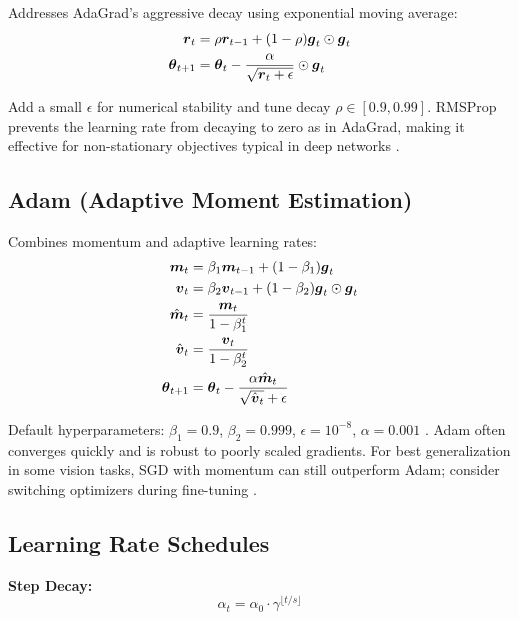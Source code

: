 Addresses AdaGrad's aggressive decay using exponential moving average:
\begin{align}
\boldsymbol{r}_t &= \rho \boldsymbol{r}_{t-1} + (1-\rho) \boldsymbol{g}_t \odot \boldsymbol{g}_t \\
\boldsymbol{\theta}_{t+1} &= \boldsymbol{\theta}_t - \frac{\alpha}{\sqrt{\boldsymbol{r}_t + \epsilon}} \odot \boldsymbol{g}_t
\end{align}

Add a small \(\epsilon\) for numerical stability and tune decay \(\rho\in[0.9,0.99]\). RMSProp prevents the learning rate from decaying to zero as in AdaGrad, making it effective for non-stationary objectives typical in deep networks \cite{Tieleman2012,WebOptimizationDLBook,D2LChapterOptimization}.

\subsection{Adam (Adaptive Moment Estimation)}

Combines momentum and adaptive learning rates:
\begin{align}
\boldsymbol{m}_t &= \beta_1 \boldsymbol{m}_{t-1} + (1-\beta_1) \boldsymbol{g}_t \\
\boldsymbol{v}_t &= \beta_2 \boldsymbol{v}_{t-1} + (1-\beta_2) \boldsymbol{g}_t \odot \boldsymbol{g}_t \\
\hat{\boldsymbol{m}}_t &= \frac{\boldsymbol{m}_t}{1 - \beta_1^t} \\
\hat{\boldsymbol{v}}_t &= \frac{\boldsymbol{v}_t}{1 - \beta_2^t} \\
\boldsymbol{\theta}_{t+1} &= \boldsymbol{\theta}_t - \frac{\alpha \hat{\boldsymbol{m}}_t}{\sqrt{\hat{\boldsymbol{v}}_t} + \epsilon}
\end{align}

Default hyperparameters: $\beta_1 = 0.9$, $\beta_2 = 0.999$, $\epsilon = 10^{-8}$, $\alpha = 0.001$ \cite{Kingma2014}. Adam often converges quickly and is robust to poorly scaled gradients. For best generalization in some vision tasks, SGD with momentum can still outperform Adam; consider switching optimizers during fine-tuning \cite{GoodfellowEtAl2016,D2LChapterOptimization,He2016}.

\subsection{Learning Rate Schedules}

\textbf{Step Decay:}
\begin{equation}
\alpha_t = \alpha_0 \cdot \gamma^{\lfloor t / s \rfloor}
\end{equation}

